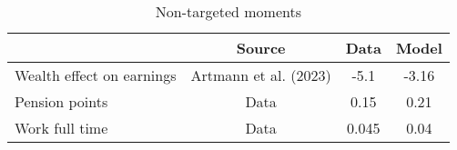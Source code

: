 \begin{table}[htbp]\caption{Non-targeted moments}\label{table:nontargeted_moments}\centering\footnotesize\begin{tabular}{lccc} \toprule  &  Source& Data & Model  \\\midrule    Wealth effect on earnings      & Artmann et al. (2023)          & -5.1 &-3.16\\ Pension points                & Data                           & 0.15 &0.21\\ Work full time              & Data                             & 0.045 &0.04\\  \bottomrule\end{tabular}\end{table}